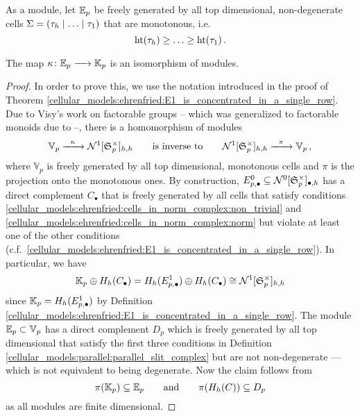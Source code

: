 \begin{defi}
    \label{cellular_models:ehrenfried:definition:cells}
    As a module, let $\E_p$ be freely generated by all top dimensional, non-degenerate cells $\Sigma = \inhom$ that are monotonous, i.e.\
    \[
        \height(\tau_h) \ge \ldots \ge \height(\tau_1) \,.
    \]
\end{defi}

\begin{lem}
    \label{cellular_models:ehrenfried:kappa_is_basechange}
    The map $\kappa \colon \E_p \to \KK_p$ is an isomorphism of modules.
\end{lem}

\begin{proof}
    In order to prove this, we use the notation introduced in the proof of Theorem \ref{cellular_models:ehrenfried:E1_is_concentrated_in_a_single_row}.
    Due to Visy's work on factorable groups \cite[Theorem 5.4.1]{Visy201011} -- which was generalized to factorable monoids due to \cite[Proposition 3.3.6]{Hess2012} --,
    there is a homomorphism of modules
    \[
        \mathbb V_p \xr{\kappa} \Ncplx^1[\Symgrp^\times_p]_{h,h} \mspc{is inverse to}{20} \Ncplx^1[\Symgrp^\times_p]_{h,h} \xr{\pi} \mathbb V_p \,,
    \]
    \label{page:visy_complex}%
    where $\mathbb V_p$ is freely generated by all top dimensional, monotonous cells and $\pi$ is the projection onto the monotonous ones.
    By construction, $E^0_{p,\bullet} \subseteq \Ncplx^0[\Symgrp^\times_p]_{\bullet,h}$ has a direct complement $C_\bullet$ that
    is freely generated by all cells that satisfy conditions \ref{cellular_models:ehrenfried:cells_in_norm_complex:non_trivial} and \ref{cellular_models:ehrenfried:cells_in_norm_complex:norm} but
    violate at least one of the other conditions (c.f.\ \ref{cellular_models:ehrenfried:E1_is_concentrated_in_a_single_row}).
    In particular, we have
    \[
        \KK_p \oplus H_h(C_\bullet) = H_h(E^1_{p,\bullet})\oplus H_h(C_\bullet) \cong \Ncplx^1[\Symgrp^\times_p]_{h,h}
    \]
    since $\KK_p = H_h(E^1_{p,\bullet})$ by Definition \ref{cellular_models:ehrenfried:E1_is_concentrated_in_a_single_row}.
    The module $\E_p \subset \V_p$ has a direct complement $D_p$ which is freely generated by all top dimensional
    that satisfy the first three conditions in Definition \ref{cellular_models:parallel:parallel_slit_complex} but are not non-degenerate --- which is not equivalent to being degenerate.
    Now the claim follows from
    \[
        \pi(\KK_p) \subseteq \E_p \mspc{and}{20} \pi(H_h(C)) \subseteq D_p
    \]
    as all modules are finite dimensional.
\end{proof}

